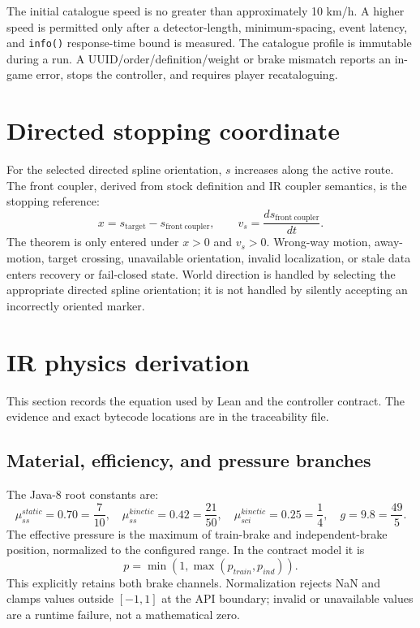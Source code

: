 \documentclass[10pt,a4paper]{article}
\begin{document}
The initial catalogue speed is no greater than approximately 10 km/h.  A
higher speed is permitted only after a detector-length, minimum-spacing, event
latency, and \texttt{info()} response-time bound is measured.  The catalogue
profile is immutable during a run.  A UUID/order/definition/weight or brake
mismatch reports an in-game error, stops the controller, and requires player
recataloguing.

\section{Directed stopping coordinate}

For the selected directed spline orientation, $s$ increases along the active
route.  The front coupler, derived from stock definition and IR coupler
semantics, is the stopping reference:
\[
 x=s_{\mathrm{target}}-s_{\mathrm{front\ coupler}},
 \qquad
 v_s=\frac{d s_{\mathrm{front\ coupler}}}{dt}.
\]
The theorem is only entered under $x>0$ and $v_s>0$.  Wrong-way motion,
away-motion, target crossing, unavailable orientation, invalid localization,
or stale data enters recovery or fail-closed state.  World direction is handled
by selecting the appropriate directed spline orientation; it is not handled by
silently accepting an incorrectly oriented marker.

\section{IR physics derivation}

This section records the equation used by Lean and the controller contract.
The evidence and exact bytecode locations are in the traceability file.

\subsection{Material, efficiency, and pressure branches}

The Java-8 root constants are:
\[
 \mu_{ss}^{static}=0.70=\frac{7}{10},\quad
 \mu_{ss}^{kinetic}=0.42=\frac{21}{50},\quad
 \mu_{sci}^{kinetic}=0.25=\frac14,
 \quad g=9.8=\frac{49}{5}.
\]
The effective pressure is the maximum of train-brake and independent-brake
position, normalized to the configured range.  In the contract model it is
\[
 p=\min(1,\max(p_{train},p_{ind})).
\]
This explicitly retains both brake channels.  Normalization rejects NaN and
clamps values outside $[-1,1]$ at the API boundary; invalid or unavailable
values are a runtime failure, not a mathematical zero.
\end{document}
